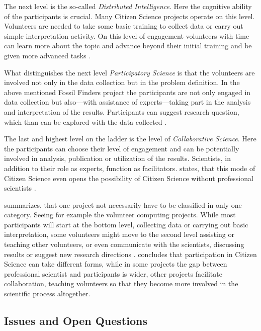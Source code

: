The next level is the so-called \textit{Distributed Intelligence}. Here the cognitive ability of the participants is crucial. Many Citizen Science projects operate on this level. Volunteers are needed to take some basic training to collect data or carry out simple interpretation activity. On this level of engagement volunteers with time can learn more about the topic and advance beyond their initial training and be given more advanced tasks \parencite[xx]{Hakalay2014}.

What distinguishes the next level \textit{Participatory Science} is that the volunteers are involved not only in the data collection but in the problem definition. In the above mentioned Fossil Finders project the participants are not only engaged in data collection but also---with assistance of experts---taking part in the analysis and interpretation of the results. Participants can suggest research question, which than can be explored with the data collected \parencite[xx]{Hakalay2014}.

The last and highest level on the ladder is the level of \textit{Collaborative Science}. Here the participants can choose their level of engagement and can be potentially involved in analysis, publication or utilization of the results. Scientists, in addition to their role as experts, function as facilitators. \citeauthor{Hakalay2014} states, that this mode of Citizen Science even opens the possibility of Citizen Science without professional scientists \parencite[xx]{Hakalay2014}.

\citeauthor{Hakalay2014} summarizes, that one project not necessarily have to be classified in only one category. Seeing for example the volunteer computing projects. While most participants will start  at the bottom level, collecting data or carrying out basic interpretation, some volunteers  might move to the second level assisting or teaching other volunteers, or even  communicate with the scientists, discussing results or suggest new research directions \parencite[xx]{Hakalay2014}. \citeauthor{Hakalay2014} concludes that participation in Citizen Science can take different forms, while in some projects the gap between professional scientist and participants is wider, other projects facilitate collaboration, teaching volunteers so that they become more involved in the scientific process altogether.

\subsection{Issues and Open Questions}
\label{sec:Issues_CS}

